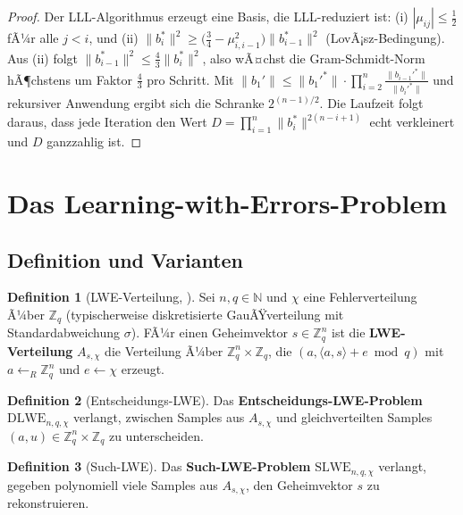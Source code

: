 ﻿\documentclass[a4paper,12pt]{article}
\theoremstyle{definition}
\newtheorem{definition}{Definition}[section]
\begin{document}
\begin{proof}
Der LLL-Algorithmus erzeugt eine Basis, die LLL-reduziert ist:
(i) $|\mu_{ij}| \leq \frac{1}{2}$ fÃ¼r alle $j < i$, und
(ii) $\|b_i^*\|^2 \geq \bigl(\frac{3}{4} - \mu_{i,i-1}^2\bigr) \|b_{i-1}^*\|^2$
(LovÃ¡sz-Bedingung).
Aus (ii) folgt $\|b_{i-1}^*\|^2 \leq \frac{4}{3} \|b_i^*\|^2$, also wÃ¤chst
die Gram-Schmidt-Norm hÃ¶chstens um Faktor $\frac{4}{3}$ pro Schritt.
Mit $\|b_1'\| \leq \|b_1'^*\| \cdot \prod_{i=2}^{n} \frac{\|b_{i-1}'^*\|}{\|b_i'^*\|}$
und rekursiver Anwendung ergibt sich die Schranke $2^{(n-1)/2}$.
Die Laufzeit folgt daraus, dass jede Iteration den Wert $D = \prod_{i=1}^{n} \|b_i^*\|^{2(n-i+1)}$
echt verkleinert und $D$ ganzzahlig ist.
\end{proof}

\section{Das Learning-with-Errors-Problem}

\subsection{Definition und Varianten}

\begin{definition}[LWE-Verteilung, \cite{Reg05}]
\label{def:lwe}
Sei $n, q \in \mathbb{N}$ und $\chi$ eine Fehlerverteilung Ã¼ber $\mathbb{Z}_q$
(typischerweise diskretisierte GauÃŸverteilung mit Standardabweichung $\sigma$).
FÃ¼r einen Geheimvektor $s \in \mathbb{Z}_q^n$ ist die \textbf{LWE-Verteilung}
$A_{s,\chi}$ die Verteilung Ã¼ber $\mathbb{Z}_q^n \times \mathbb{Z}_q$,
die $(a, \langle a, s \rangle + e \bmod q)$ mit $a \leftarrow_R \mathbb{Z}_q^n$
und $e \leftarrow \chi$ erzeugt.
\end{definition}

\begin{definition}[Entscheidungs-LWE]
Das \textbf{Entscheidungs-LWE-Problem} $\mathrm{DLWE}_{n,q,\chi}$ verlangt,
zwischen Samples aus $A_{s,\chi}$ und gleichverteilten Samples
$(a, u) \in \mathbb{Z}_q^n \times \mathbb{Z}_q$ zu unterscheiden.
\end{definition}

\begin{definition}[Such-LWE]
Das \textbf{Such-LWE-Problem} $\mathrm{SLWE}_{n,q,\chi}$ verlangt,
gegeben polynomiell viele Samples aus $A_{s,\chi}$, den Geheimvektor $s$ zu rekonstruieren.
\end{definition}
\end{document}
